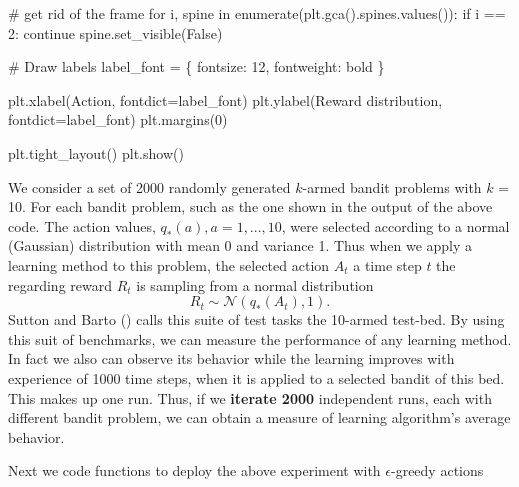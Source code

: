 \documentclass[
  letterpaper,
]{krantz}
\makeatletter
\newenvironment{Shaded}{\begin{snugshade}}{\end{snugshade}}
\newcommand{\BuiltInTok}[1]{\textcolor[rgb]{0.00,0.23,0.31}{#1}}
\newcommand{\CommentTok}[1]{\textcolor[rgb]{0.37,0.37,0.37}{#1}}
\newcommand{\ControlFlowTok}[1]{\textcolor[rgb]{0.00,0.23,0.31}{#1}}
\newcommand{\DecValTok}[1]{\textcolor[rgb]{0.68,0.00,0.00}{#1}}
\newcommand{\KeywordTok}[1]{\textcolor[rgb]{0.00,0.23,0.31}{#1}}
\newcommand{\NormalTok}[1]{\textcolor[rgb]{0.00,0.23,0.31}{#1}}
\newcommand{\OperatorTok}[1]{\textcolor[rgb]{0.37,0.37,0.37}{#1}}
\newcommand{\StringTok}[1]{\textcolor[rgb]{0.13,0.47,0.30}{#1}}
\newcommand{\VariableTok}[1]{\textcolor[rgb]{0.07,0.07,0.07}{#1}}
\newenvironment{kframe}{%
\medskip{}
\setlength{\fboxsep}{.8em}
 \def\at@end@of@kframe{}%
 \ifinner\ifhmode%
  \def\at@end@of@kframe{\end{minipage}}%
  \begin{minipage}{\columnwidth}%
 \fi\fi%
 \def\FrameCommand##1{\hskip\@totalleftmargin \hskip-\fboxsep
 \colorbox{shadecolor}{##1}\hskip-\fboxsep
     \hskip-\linewidth \hskip-\@totalleftmargin \hskip\columnwidth}%
 \MakeFramed {\advance\hsize-\width
   \@totalleftmargin\z@ \linewidth\hsize
   \@setminipage}}%
 {\par\unskip\endMakeFramed%
 \at@end@of@kframe}
\renewenvironment{Shaded}{\begin{kframe}}{\end{kframe}}
\theoremstyle{plain}
\theoremstyle{definition}
\theoremstyle{definition}
\theoremstyle{remark}
\makeatother
\begin{document}
\begin{codelisting}
\begin{Shaded}
\begin{Highlighting}[]
\CommentTok{\# get rid of the frame}
\ControlFlowTok{for}\NormalTok{ i, spine }\KeywordTok{in} \BuiltInTok{enumerate}\NormalTok{(plt.gca().spines.values()):}
    \ControlFlowTok{if}\NormalTok{ i }\OperatorTok{==} \DecValTok{2}\NormalTok{: }\ControlFlowTok{continue}
\NormalTok{    spine.set\_visible(}\VariableTok{False}\NormalTok{)}
    

\CommentTok{\# Draw labels}
\NormalTok{label\_font }\OperatorTok{=}\NormalTok{ \{}
    \StringTok{\textquotesingle{}fontsize\textquotesingle{}}\NormalTok{: }\DecValTok{12}\NormalTok{,}
    \StringTok{\textquotesingle{}fontweight\textquotesingle{}}\NormalTok{: }\StringTok{\textquotesingle{}bold\textquotesingle{}}
\NormalTok{\}}

\NormalTok{plt.xlabel(}\StringTok{\textquotesingle{}Action\textquotesingle{}}\NormalTok{, fontdict}\OperatorTok{=}\NormalTok{label\_font)}
\NormalTok{plt.ylabel(}\StringTok{\textquotesingle{}Reward distribution\textquotesingle{}}\NormalTok{, fontdict}\OperatorTok{=}\NormalTok{label\_font)}
\NormalTok{plt.margins(}\DecValTok{0}\NormalTok{)}

\NormalTok{plt.tight\_layout()}
\NormalTok{plt.show()}
\end{Highlighting}
\end{Shaded}

\end{codelisting}

We consider a set of 2000 randomly generated \(k\)-armed bandit problems
with \(k\) = 10. For each bandit problem, such as the one shown in the
output of the above code. The action values,
\(q_{*} (a), a = 1, . . . , 10\), were selected according to a normal
(Gaussian) distribution with mean 0 and variance 1. Thus when we apply a
learning method to this problem, the selected action \(A_t\) a time step
\(t\) the regarding reward \(R_t\) is sampling from a normal
distribution \[
  R_{t} \sim \mathcal{N}(q_{*}(A_t), 1).
\] Sutton and Barto () calls this suite of test tasks the 10-armed test-bed. By using this
suit of benchmarks, we can measure the performance of any learning
method. In fact we also can observe its behavior while the learning
improves with experience of 1000 time steps, when it is applied to a
selected bandit of this bed. This makes up one run. Thus, if we
\textbf{iterate 2000} independent runs, each with different bandit
problem, we can obtain a measure of learning algorithm's average
behavior.

Next we code functions to deploy the above experiment with
\(\epsilon\)-greedy actions
\end{document}
